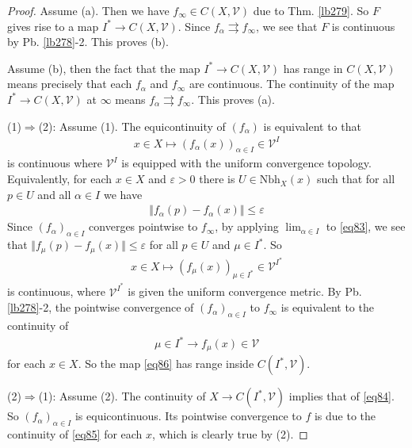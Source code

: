 \documentclass[12pt,b5paper,notitlepage]{article}
\theoremstyle{definition}
\theoremstyle{plain}
\newcommand{\mc}{\mathcal}
\newcommand{\Nbh}{\mathrm{Nbh}}
\newcommand{\eps}{\varepsilon}
\numberwithin{equation}{section}
\begin{document}



\begin{proof}
Assume (a). Then we have $f_\infty\in C(X,\mc V)$ due to Thm. \ref{lb279}. So $F$ gives rise to a map $I^*\rightarrow C(X,\mc V)$. Since $f_\alpha\rightrightarrows f_\infty$, we see that $F$ is continuous by Pb. \ref{lb278}-2. This proves (b).

Assume (b), then the fact that the map $I^*\rightarrow C(X,\mc V)$ has range in $C(X,\mc V)$ means precisely that each $f_\alpha$ and $f_\infty$ are continuous. The continuity of the map $I^*\rightarrow C(X,\mc V)$ at $\infty$ means $f_\alpha\rightrightarrows f_\infty$. This proves (a).


(1)$\Rightarrow$(2): Assume (1). The equicontinuity of $(f_\alpha)$ is equivalent to that
\begin{align}
x\in X\mapsto (f_\alpha(x))_{\alpha\in I}\in \mc V^I  \label{eq84}
\end{align}
is continuous where $\mc V^I$ is equipped with the uniform convergence topology. Equivalently, for each $x\in X$ and $\eps>0$ there is $U\in\Nbh_X(x)$ such that for all $p\in U$ and all $\alpha\in I$ we have
\begin{align}
\Vert f_\alpha(p)-f_\alpha(x)\Vert\leq\eps \label{eq83}
\end{align} 
Since $(f_\alpha)_{\alpha\in I}$ converges pointwise to $f_\infty$, by applying $\lim_{\alpha\in I}$ to \eqref{eq83}, we see that $\Vert f_\mu(p)-f_\mu(x)\Vert\leq\eps$ for all $p\in U$ and $\mu\in I^*$. So
\begin{align}\label{eq86}
x\in X\mapsto (f_\mu(x))_{\mu\in I^*}\in \mc V^{I^*}
\end{align}
is continuous, where $\mc V^{I^*}$ is given the uniform convergence metric. By Pb. \ref{lb278}-2, the pointwise convergence of $(f_\alpha)_{\alpha\in I}$ to $f_\infty$ is equivalent to the continuity of
\begin{align}\label{eq85}
\mu\in I^*\rightarrow f_\mu(x)\in\mc V
\end{align}
for each $x\in X$. So the map \eqref{eq86} has range inside $C(I^*,\mc V)$.

(2)$\Rightarrow$(1): Assume (2). The continuity of $X\rightarrow C(I^*,\mc V)$ implies that of \eqref{eq84}. So $(f_\alpha)_{\alpha\in I}$ is equicontinuous. Its pointwise convergence to $f$ is due to the continuity of \eqref{eq85} for each $x$, which is clearly true by (2).
\end{proof}
\end{document}
